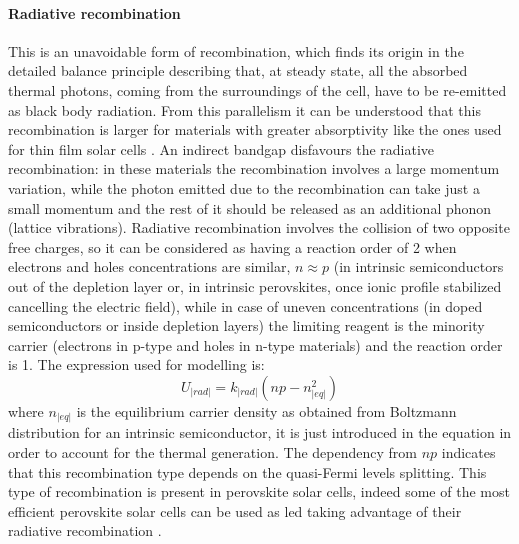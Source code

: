 		\paragraph{Radiative recombination}
		This is an unavoidable form of recombination, which finds its origin in the detailed balance principle describing that, at steady state, all the absorbed thermal photons, coming from the surroundings of the cell, have to be re-emitted as black body radiation.
		From this parallelism it can be understood that this recombination is larger for materials with greater absorptivity \cite{Nelson2003} like the ones used for thin film solar cells \cite{Tvingstedt2015}.
		An indirect bandgap disfavours the radiative recombination: in these materials the recombination involves a large momentum variation, while the photon emitted due to the recombination can take just a small momentum and the rest of it should be released as an additional phonon (lattice vibrations).
		Radiative recombination involves the collision of two opposite free charges, so it can be considered as having a reaction order of 2 when electrons and holes concentrations are similar, $n \approx p$ (in intrinsic semiconductors out of the depletion layer or, in intrinsic perovskites, once ionic profile stabilized cancelling the electric field), while in case of uneven concentrations (in doped semiconductors or inside depletion layers) the limiting reagent is the minority carrier (electrons in p-type and holes in n-type materials) and the reaction order is 1.
		The expression used for modelling is:
		 \begin{equation}
		U_|rad| = k_|rad| (np-n_|eq|^2)
				\end{equation}
		where $n_|eq|$ is the equilibrium carrier density as obtained from Boltzmann distribution for an intrinsic semiconductor, it is just introduced in the equation in order to account for the thermal generation.
		The dependency from $np$ indicates that this recombination type depends on the quasi\hyp{}Fermi levels splitting.
		This type of recombination is present in perovskite solar cells, indeed some of the most efficient perovskite solar cells can be used as \gls{led} taking advantage of their radiative recombination \cite{Bi2016}.

